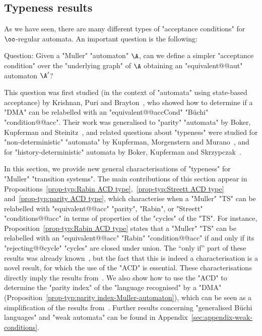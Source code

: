 \documentclass{theoretics}
\begin{document}
\subsection{Typeness results}\label{subsec-corollaries:typeness}

As we have seen, there are many different types of "acceptance conditions" for $\oo$-regular automata. An important question is the following:

\begin{center}
	Question: Given a "Muller" "automaton" $\A$, can we define a simpler "acceptance condition" over the "underlying graph" of $\A$ obtaining an "equivalent@@aut" automaton $\A'$?
\end{center}

This question was first studied (in the context of "automata" using state-based acceptance) by Krishnan, Puri and Brayton~\cite{KPB94DetOmega,KPB95Structural}, who showed how to determine if a "DMA" can be relabelled with an "equivalent@@accCond" "B\"uchi" "condition@@acc". Their work was generalised to "parity" "automata" by Boker, Kupferman and Steinitz~\cite{BKS10Paritizing}, and related questions about "typeness" were studied for "non-deterministic" "automata" by Kupferman, Morgenstern and Murano~\cite{KMM06Typeness}, and for "history-deterministic" automata by Boker, Kupferman and Skrzypczak~\cite{BKS17HowDeterministicGFG}.

In this section, we provide new general characterisations of "typeness" for "Muller" "transition systems". The main contributions of this section appear in Propositions~\ref{prop-typ:Rabin ACD type},~\ref{prop-typ:Streett ACD type} and~\ref{prop-typ:parity ACD type}, which characterise when a "Muller" "TS" can be relabelled with "equivalent@@acc" "parity", "Rabin", or "Streett" "conditions@@acc" in terms of properties of the "cycles" of the "TS". For instance, Proposition~\ref{prop-typ:Rabin ACD type} states that a "Muller" "TS" can be relabelled with an "equivalent@@acc" "Rabin" "condition@@acc" if and only if its "rejecting@@cycle" "cycles" are closed under union. The ``only if'' part of these results was already known~\cite{Loding1999Optimal}, but the fact that this is indeed a characterisation is a novel result, for which the use of the "ACD" is essential. 
These characterisations directly imply the results from~\cite{BKS10Paritizing,KPB94DetOmega,KPB95Structural}.
We also show how to use the "ACD" to determine the "parity index" of the "language recognised" by a "DMA" (Proposition~\ref{prop-typ:parity index-Muller-automaton}), which can be seen as a simplification of the results from~\cite[Section~3.2]{KPB95Structural}. 
Further results concerning "generalised B\"uchi languages" and "weak automata" can be found in Appendix~\ref{sec:appendix-weak-conditions}.
\end{document}
